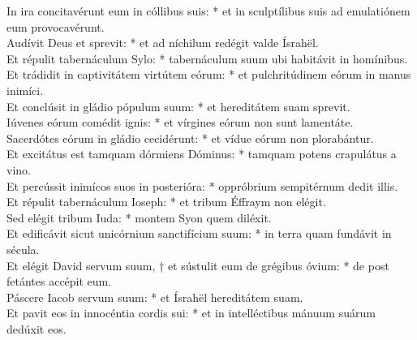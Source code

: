 {	%
	In ira concitavérunt eum in cóllibus suis: * et in sculptílibus suis ad emulatiónem eum provocavérunt. \\
	Audívit Deus et sprevit: * et ad níchilum redégit valde Ísrahël. \\
	Et répulit tabernáculum Sylo: * tabernáculum suum ubi habitávit in homínibus. \\
	Et trádidit in captivitátem virtútem eórum: * et pulchritúdinem eórum in manus inimíci. \\
	Et conclúsit in gládio pópulum suum: * et hereditátem suam sprevit. \\
	Iúvenes eórum comédit ignis: * et vírgines eórum non sunt lamentáte. \\
	Sacerdótes eórum in gládio cecidérunt: * et vídue eórum non plorabántur. \\
	Et excitátus est tamquam dórmiens Dóminus: * tamquam potens crapulátus a vino. \\
	Et percússit inimícos suos in posterióra: * oppróbrium sempitérnum dedit illis. \\
	Et répulit tabernáculum Ioseph: * et tribum Éffraym non elégit. \\
	Sed elégit tribum Iuda: * montem Syon quem diléxit. \\
	Et edificávit sicut unicórnium sanctifícium suum: * in terra quam fundávit in sécula. \\
	Et elégit David servum suum, † et sústulit eum de grégibus óvium: * de post fetántes accépit eum. \\
	Páscere Iacob servum suum: * et Ísrahël hereditátem suam. \\
	Et pavit eos in innocéntia cordis sui: * et in intelléctibus mánuum suárum dedúxit eos.
}

